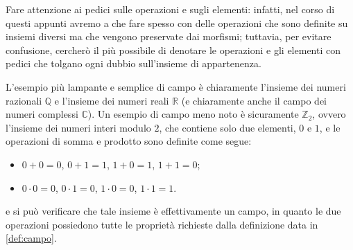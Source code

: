 \begin{remark}
    Fare attenzione ai pedici sulle operazioni e sugli elementi: infatti, nel corso di questi appunti avremo a che fare spesso con delle operazioni che sono definite su insiemi diversi ma che vengono preservate dai morfismi; tuttavia, per evitare confusione, cercherò il più possibile di denotare le operazioni e gli elementi con pedici che tolgano ogni dubbio sull'insieme di appartenenza.
\end{remark}
\begin{example}
    L'esempio più lampante e semplice di campo è chiaramente l'insieme dei numeri razionali $\mathbb{Q}$ e l'insieme dei numeri reali $\mathbb{R}$ (e chiaramente anche il campo dei numeri complessi $\mathbb{C}$). Un esempio di campo meno noto è sicuramente $\mathbb{Z}_2$, ovvero l'insieme dei numeri interi modulo $2$, che contiene solo due elementi, $0$ e $1$, e le operazioni di somma e prodotto sono definite come segue:
    \begin{itemize}
        \item $0 + 0 = 0$, $0 + 1 = 1$, $1 + 0 = 1$, $1 + 1 = 0$;
        \item $0 \cdot 0 = 0$, $0 \cdot 1 = 0$, $1 \cdot 0 = 0$, $1 \cdot 1 = 1$.
    \end{itemize}
    e si può verificare che tale insieme è effettivamente un campo, in quanto le due operazioni possiedono tutte le proprietà richieste dalla definizione data in \ref{def:campo}.
\end{example}
